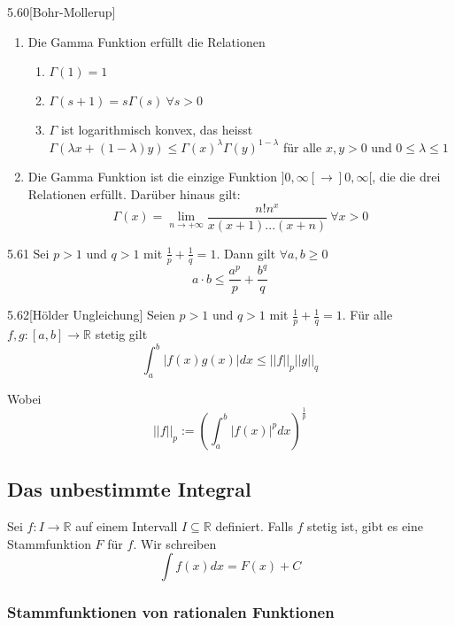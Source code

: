 \documentclass[8pt,a4paper,twocolumn,table]{extarticle}
\newcommand{\R}{\mathbb{R}}
\begin{document}
\begin{satz}{5.60}[Bohr-Mollerup]
    \begin{enumerate}
        \item Die Gamma Funktion erfüllt die Relationen
              \begin{enumerate}
                  \item $\Gamma(1) = 1$
                  \item $\Gamma(s + 1) = s\Gamma(s)\ \forall s > 0$
                  \item $\Gamma$ ist logarithmisch konvex, das heisst $\Gamma(\lambda x + (1 - \lambda)y) \le \Gamma(x)^\lambda \Gamma(y)^{1 - \lambda}$
                        für alle $x,y > 0$ und $0 \le \lambda \le 1$
              \end{enumerate}
        \item Die Gamma Funktion ist die einzige Funktion $]0, \infty[ \to ]0, \infty[$, die die drei Relationen erfüllt.
              Darüber hinaus gilt:
              \[ \Gamma(x) = \lim_{n \to +\infty} \frac{n! n^x}{x(x+1)...(x+n)}\ \forall x > 0 \]
    \end{enumerate}
\end{satz}

\begin{lemma}{5.61}
    Sei $p > 1$ und $q > 1$ mit $\frac{1}{p} + \frac{1}{q} = 1$.
    Dann gilt $\forall a,b \ge 0$
    \[ a \cdot b \le \frac{a^p}{p} + \frac{b^q}{q} \]
\end{lemma}

\begin{satz}{5.62}[Hölder Ungleichung]
    Seien $p > 1$ und $q > 1$ mit $\frac{1}{p} + \frac{1}{q} = 1$.
    Für alle $f, g: [a,b] \to \R$ stetig gilt
    \[ \int_a^b |f(x)g(x)|dx \le ||f||_p||g||_q \]

    Wobei
    \[ ||f||_p := \left( \int_a^b |f(x)|^p dx \right)^{\frac{1}{p}} \]
\end{satz}

\subsection{Das unbestimmte Integral}

Sei $f: I \to \R$ auf einem Intervall $I \subseteq \R$ definiert. Falls $f$ stetig ist, gibt es eine Stammfunktion $F$ für $f$. Wir schreiben
\[ \int f(x)dx = F(x) + C \]

\subsubsection{Stammfunktionen von rationalen Funktionen}
\end{document}
